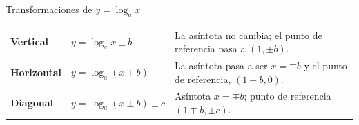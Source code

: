 \documentclass[11pt,a4paper]{article}
\begin{document}
\begin{fmprop}{Transformaciones de $y=\log_ax$}
\begin{center}\renewcommand{\arraystretch}{1.5}\small\begin{tabularx}{\linewidth}{>{\raggedright\arraybackslash}p{3.2cm}>{\raggedright\arraybackslash}X>{\raggedright\arraybackslash}X}\toprule
\textbf{Vertical} & $y=\log_ax\pm b$ & La asíntota no cambia; el punto de referencia pasa a $(1,\pm b)$.\\[3pt]
\textbf{Horizontal} & $y=\log_a(x\pm b)$ & La asíntota pasa a ser $x=\mp b$ y el punto de referencia, $(1\mp b,0)$.\\[3pt]
\textbf{Diagonal} & $y=\log_a(x\pm b)\pm c$ & Asíntota $x=\mp b$; punto de referencia $(1\mp b,\pm c)$.\\[3pt]
\bottomrule\end{tabularx}\end{center}


\end{fmprop}
\end{document}
